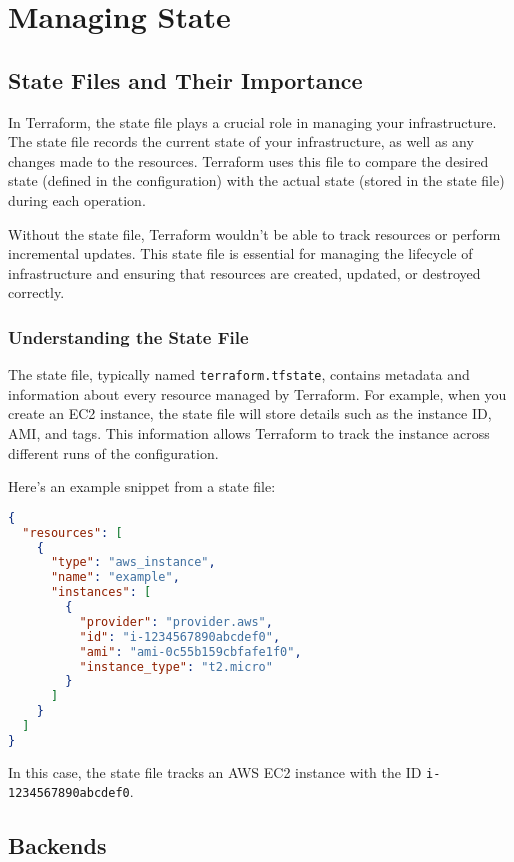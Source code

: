 \chapter{Managing State}

\sloppy

\section{State Files and Their Importance}

In Terraform, the state file plays a crucial role in managing your infrastructure. The state file records the current state of your infrastructure, as well as any changes made to the resources. Terraform uses this file to compare the desired state (defined in the configuration) with the actual state (stored in the state file) during each operation.

Without the state file, Terraform wouldn't be able to track resources or perform incremental updates. This state file is essential for managing the lifecycle of infrastructure and ensuring that resources are created, updated, or destroyed correctly.

\subsection{Understanding the State File}

The state file, typically named \texttt{terraform.tfstate}, contains metadata and information about every resource managed by Terraform. For example, when you create an EC2 instance, the state file will store details such as the instance ID, AMI, and tags. This information allows Terraform to track the instance across different runs of the configuration.

Here's an example snippet from a state file:

\begin{lstlisting}[language=json]
{
  "resources": [
    {
      "type": "aws_instance",
      "name": "example",
      "instances": [
        {
          "provider": "provider.aws",
          "id": "i-1234567890abcdef0",
          "ami": "ami-0c55b159cbfafe1f0",
          "instance_type": "t2.micro"
        }
      ]
    }
  ]
}
\end{lstlisting}

In this case, the state file tracks an AWS EC2 instance with the ID \texttt{i-1234567890abcdef0}.

\section{Backends}

